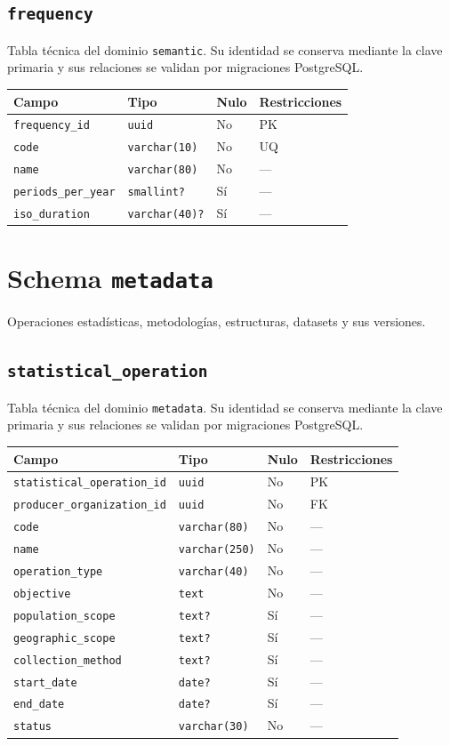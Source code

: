 \documentclass[11pt]{article}
\begin{document}
\subsection{\texttt{frequency}}
Tabla técnica del dominio \texttt{semantic}. Su identidad se conserva mediante la clave primaria y sus relaciones se validan por migraciones PostgreSQL.
\begin{longtable}{>{\raggedright\arraybackslash}p{} p{} p{} p{}}
\toprule Campo & Tipo & Nulo & Restricciones \\ \midrule\endhead
\texttt{frequency\_id} & \texttt{uuid} & No & PK \\
\texttt{code} & \texttt{varchar(10)} & No & UQ \\
\texttt{name} & \texttt{varchar(80)} & No & --- \\
\texttt{periods\_per\_year} & \texttt{smallint?} & Sí & --- \\
\texttt{iso\_duration} & \texttt{varchar(40)?} & Sí & --- \\
\bottomrule\end{longtable}
\section{Schema \texttt{metadata}}
Operaciones estadísticas, metodologías, estructuras, datasets y sus versiones.
\subsection{\texttt{statistical\_operation}}
Tabla técnica del dominio \texttt{metadata}. Su identidad se conserva mediante la clave primaria y sus relaciones se validan por migraciones PostgreSQL.
\begin{longtable}{>{\raggedright\arraybackslash}p{} p{} p{} p{}}
\toprule Campo & Tipo & Nulo & Restricciones \\ \midrule\endhead
\texttt{statistical\_operation\_id} & \texttt{uuid} & No & PK \\
\texttt{producer\_organization\_id} & \texttt{uuid} & No & FK \\
\texttt{code} & \texttt{varchar(80)} & No & --- \\
\texttt{name} & \texttt{varchar(250)} & No & --- \\
\texttt{operation\_type} & \texttt{varchar(40)} & No & --- \\
\texttt{objective} & \texttt{text} & No & --- \\
\texttt{population\_scope} & \texttt{text?} & Sí & --- \\
\texttt{geographic\_scope} & \texttt{text?} & Sí & --- \\
\texttt{collection\_method} & \texttt{text?} & Sí & --- \\
\texttt{start\_date} & \texttt{date?} & Sí & --- \\
\texttt{end\_date} & \texttt{date?} & Sí & --- \\
\texttt{status} & \texttt{varchar(30)} & No & --- \\
\bottomrule\end{longtable}
\end{document}

